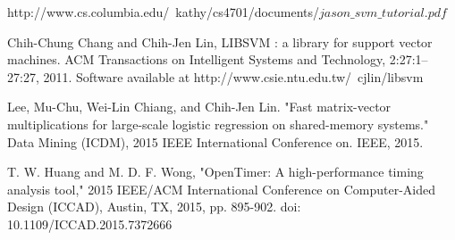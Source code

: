 \begin{thebibliography}{1}
http://www.cs.columbia.edu/~kathy/cs4701/documents/$jason\_svm\_tutorial.pdf$

Chih-Chung Chang and Chih-Jen Lin, LIBSVM : a library for support vector machines. ACM Transactions on Intelligent Systems and Technology, 2:27:1--27:27, 2011. Software available at http://www.csie.ntu.edu.tw/~cjlin/libsvm

Lee, Mu-Chu, Wei-Lin Chiang, and Chih-Jen Lin. "Fast matrix-vector multiplications for large-scale logistic regression on shared-memory systems." Data Mining (ICDM), 2015 IEEE International Conference on. IEEE, 2015.

T. W. Huang and M. D. F. Wong, "OpenTimer: A high-performance timing analysis tool," 2015 IEEE/ACM International Conference on Computer-Aided Design (ICCAD), Austin, TX, 2015, pp. 895-902.
doi: 10.1109/ICCAD.2015.7372666



%
%
%
%
%
%
%
%
%
%
%
%
%
%
%
%
%
%
%
%
%
%
%
%
%
%
%
%
%
%
%


\end{thebibliography}

